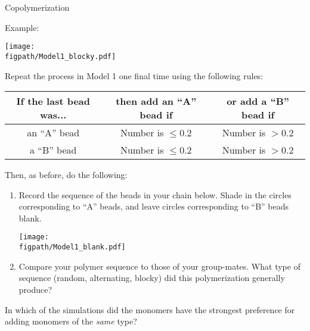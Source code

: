 \begin{activity}{Copolymerization}
\begin{ctqs}
\begin{enumerate}
\begin{solution}[1.5in]
{			Example:
			
				\centerline{\texttt{[image: \\figpath/Model1\_blocky.pdf]}}
				}\end{solution}
		\end{enumerate}
		
	\question \label{\labelbase:ctq:sim-biased} Repeat the process in Model 1 one final time using the following rules:	\begin{center}
					\renewcommand{\arraystretch}{1.5}
					\begin{tabular}{|c|c|c|}
						\hline
						\textbf{If the last bead was...} &  \textbf{then add an ``A'' bead if} & \textbf{or add a ``B'' bead if}\\\hline
						 an ``A'' bead & Number is $\leq 0.2$ & Number is $> 0.2$ \\\hline
						 a ``B'' bead & Number is $\leq 0.2$ & Number is $> 0.2$ \\\hline
					\end{tabular}
					\end{center}
	
		Then, as before, do the following:
		\begin{enumerate}
			\item Record the sequence of the beads in your chain below.  Shade in the circles corresponding to ``A'' beads, and leave circles corresponding to ``B'' beads blank.
	
		\vspace{6pt}
		\centerline{\texttt{[image: \\figpath/Model1\_blank.pdf]}}
	
			\item Compare your polymer sequence to those of your group-mates.  What type of sequence (random, alternating, blocky) did this polymerization generally produce?
			
				\begin{solution}[1.25in]\end{solution}
		\end{enumerate}
		
	\question In which of the simulations did the monomers have the strongest preference for adding monomers of the \emph{same} type?
	

\end{ctqs}
\end{activity}
